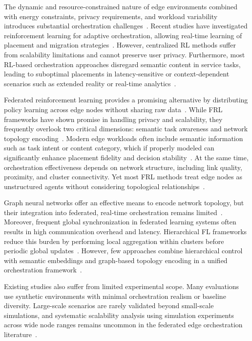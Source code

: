 \documentclass[conference]{IEEEtran}
\begin{document}
	The dynamic and resource-constrained nature of edge environments combined with energy constraints, privacy requirements, and workload variability introduces substantial orchestration challenges~\cite{yang2023rlcs}. Recent studies have investigated reinforcement learning for adaptive orchestration, allowing real-time learning of placement and migration strategies~\cite{shi2023}. However, centralized RL methods suffer from scalability limitations and cannot preserve user privacy. Furthermore, most RL-based orchestration approaches disregard semantic content in service tasks, leading to suboptimal placements in latency-sensitive or context-dependent scenarios such as extended reality or real-time analytics~\cite{zhang2025semantic}.
	
	Federated reinforcement learning provides a promising alternative by distributing policy learning across edge nodes without sharing raw data~\cite{wu2024topology}. While FRL frameworks have shown promise in handling privacy and scalability, they frequently overlook two critical dimensions: semantic task awareness and network topology encoding~\cite{ogenyi2025comprehensive, zhang2024optimizing}. Modern edge workloads often include semantic information such as task intent or content category, which if properly modeled can significantly enhance placement fidelity and decision stability~\cite{zhang2025semantic}. At the same time, orchestration effectiveness depends on network structure, including link quality, proximity, and cluster connectivity. Yet most FRL methods treat edge nodes as unstructured agents without considering topological relationships~\cite{wu2024topology}.
	
	Graph neural networks offer an effective means to encode network topology, but their integration into federated, real-time orchestration remains limited~\cite{makris2024gnnrl, zhang2024optimizing}. Moreover, frequent global synchronization in federated learning systems often results in high communication overhead and latency. Hierarchical FL frameworks reduce this burden by performing local aggregation within clusters before periodic global updates~\cite{sad2024fearless, he2022acefl}. However, few approaches combine hierarchical control with semantic embeddings and graph-based topology encoding in a unified orchestration framework~\cite{wu2024topology, vahabi2025}.
	
	Existing studies also suffer from limited experimental scope. Many evaluations use synthetic environments with minimal orchestration realism or baseline diversity. Large-scale scenarios are rarely validated beyond small-scale simulations, and systematic scalability analysis using simulation experiments across wide node ranges remains uncommon in the federated edge orchestration literature~\cite{yang2023rlcs, shi2023}.
	
\end{document}
